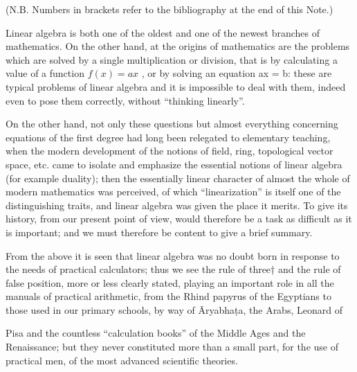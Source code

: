 \backmatter
{}

(N.B. Numbers in brackets refer to the bibliography at the end of this Note.)

Linear algebra is both one of the oldest and one of the newest branches of mathematics. On the other hand, at the origins of mathematics are the problems which are solved by a single multiplication or division, that is by calculating a value of a function \(f(x) = ax\) , or by solving an equation ax = b: these are typical problems of linear algebra and it is impossible to deal with them, indeed even to pose them correctly, without ``thinking linearly''.

On the other hand, not only these questions but almost everything concerning equations of the first degree had long been relegated to elementary teaching, when the modern development of the notions of field, ring, topological vector space, etc. came to isolate and emphasize the essential notions of linear algebra (for example duality); then the essentially linear character of almost the whole of modern mathematics was perceived, of which ``linearization'' is itself one of the distinguishing traits, and linear algebra was given the place it merits. To give its history, from our present point of view, would therefore be a task as difficult as it is important; and we must therefore be content to give a brief summary.

From the above it is seen that linear algebra was no doubt born in response to the needs of practical calculators; thus we see the rule of three† and the rule of false position, more or less clearly stated, playing an important role in all the manuals of practical arithmetic, from the Rhind papyrus of the Egyptians to those used in our primary schools, by way of Āryabhaṭa, the Arabs, Leonard of

Pisa and the countless ``calculation books'' of the Middle Ages and the Renaissance; but they never constituted more than a small part, for the use of practical men, of the most advanced scientific theories.

